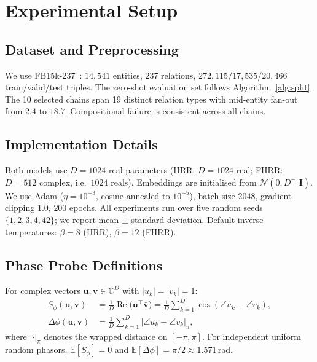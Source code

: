 \documentclass[11pt]{article}
\theoremstyle{definition}
\newcommand{\Cb}{\mathbb{C}}
\DeclareMathOperator{\Real}{Re}
\begin{document}
\section{Experimental Setup}
\label{sec:experiments}

\subsection{Dataset and Preprocessing}
We use FB15k-237~\cite{toutanova2015observed}: $14{,}541$ entities, $237$
relations, $272{,}115$/$17{,}535$/$20{,}466$ train/valid/test triples. The
zero-shot evaluation set follows Algorithm~\ref{alg:split}. The 10 selected
chains span 19 distinct relation types with mid-entity fan-out from $2.4$ to
$18.7$. Compositional failure is consistent across all chains.

\subsection{Implementation Details}
Both models use $D=1024$ real parameters (HRR: $D=1024$ real; FHRR: $D=512$
complex, i.e.\ $1024$ reals). Embeddings are initialised from
$\mathcal{N}(0, D^{-1}\mathbf{I})$. We use Adam ($\eta=10^{-3}$, cosine-annealed
to $10^{-5}$), batch size $2048$, gradient clipping $1.0$, $200$ epochs.
All experiments run over five random seeds $\{1,2,3,4,42\}$; we report
mean $\pm$ standard deviation. Default inverse temperatures: $\beta=8$ (HRR),
$\beta=12$ (FHRR).

\subsection{Phase Probe Definitions}
\label{sec:probes}
For complex vectors $\mathbf{u}, \mathbf{v} \in \Cb^D$ with $|u_k|=|v_k|=1$:
\begin{align}
  S_\phi(\mathbf{u}, \mathbf{v})
    &= \frac{1}{D}\Real\!\bigl(\mathbf{u}^\top \bar{\mathbf{v}}\bigr)
     = \frac{1}{D}\sum_{k=1}^D \cos(\angle u_k - \angle v_k),
  \label{eq:phasor-cos}\\
  \Delta\phi(\mathbf{u}, \mathbf{v})
    &= \frac{1}{D}\sum_{k=1}^D |\angle u_k - \angle v_k|_\pi,
  \label{eq:phase-err}
\end{align}
where $|\cdot|_\pi$ denotes the wrapped distance on $[-\pi,\pi]$.
For independent uniform random phasors,
$\mathbb{E}[S_\phi]=0$ and $\mathbb{E}[\Delta\phi]=\pi/2 \approx 1.571$\,rad.
\end{document}

